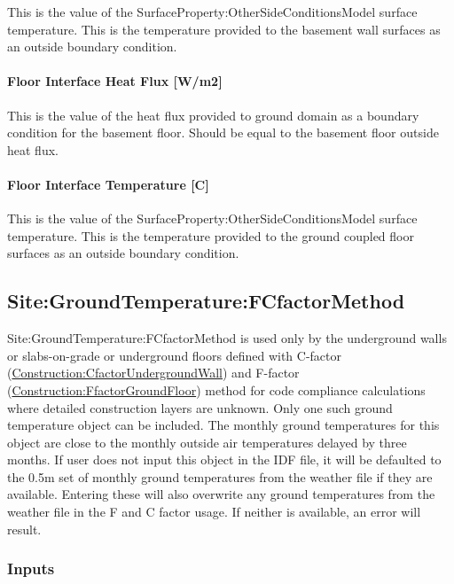 This is the value of the SurfaceProperty:OtherSideConditionsModel surface temperature. This is the temperature provided to the basement wall surfaces as an outside boundary condition.

\paragraph{Floor Interface Heat Flux {[}W/m2{]}}\label{floor-interface-heat-flux-wm2}

This is the value of the heat flux provided to ground domain as a boundary condition for the basement floor. Should be equal to the basement floor outside heat flux.

\paragraph{Floor Interface Temperature {[}C{]}}\label{floor-interface-temperature-c}

This is the value of the SurfaceProperty:OtherSideConditionsModel surface temperature. This is the temperature provided to the ground coupled floor surfaces as an outside boundary condition.

\subsection{Site:GroundTemperature:FCfactorMethod}\label{sitegroundtemperaturefcfactormethod}

Site:GroundTemperature:FCfactorMethod is used only by the underground walls or slabs-on-grade or underground floors defined with C-factor (\hyperref[constructioncfactorundergroundwall]{Construction:CfactorUndergroundWall}) and F-factor (\hyperref[constructionffactorgroundfloor]{Construction:FfactorGroundFloor}) method for code compliance calculations where detailed construction layers are unknown. Only one such ground temperature object can be included. The monthly ground temperatures for this object are close to the monthly outside air temperatures delayed by three months. If user does not input this object in the IDF file, it will be defaulted to the 0.5m set of monthly ground temperatures from the weather file if they are available. Entering these will also overwrite any ground temperatures from the weather file in the F and C factor usage. If neither is available, an error will result.

\subsubsection{Inputs}\label{inputs-18-004}

